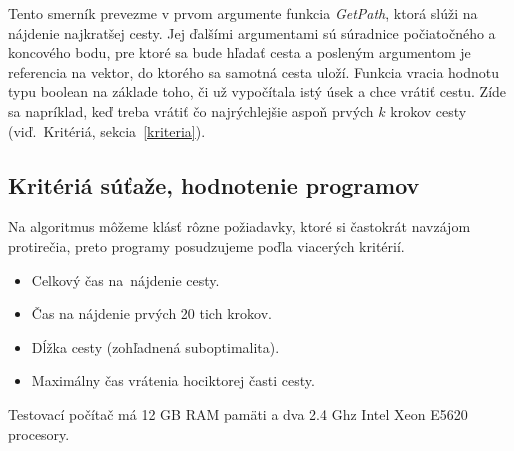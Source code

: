 Tento smerník prevezme v prvom argumente funkcia \emph{GetPath}, ktorá slúži na nájdenie najkratšej cesty. Jej ďalšími argumentami
sú súradnice počiatočného a koncového bodu, pre ktoré sa bude hľadať cesta a posleným argumentom je referencia na vektor, do ktorého sa samotná cesta uloží. Funkcia vracia hodnotu typu boolean na základe toho, či už vypočítala istý úsek a chce vrátiť cestu. Zíde sa napríklad, keď treba vrátiť čo najrýchlejšie aspoň prvých $k$ krokov cesty (viď.~Kritériá, sekcia~\ref{kriteria}).



\subsection{Kritériá súťaže, hodnotenie programov}
Na algoritmus môžeme klásť rôzne požiadavky, ktoré si častokrát navzájom protirečia, preto programy posudzujeme poďla viacerých kritérií.
\label{kriteria}
\begin{itemize}
\item Celkový čas na~nájdenie cesty.
\item Čas na nájdenie prvých 20 tich krokov.
\item Dĺžka cesty (zohľadnená suboptimalita).
\item Maximálny čas vrátenia hociktorej časti cesty.
\end{itemize}

Testovací počítač má 12 GB RAM pamäti a dva 2.4 Ghz Intel Xeon E5620
procesory.